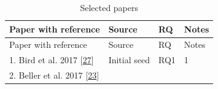 \documentclass[]{book}
\begin{document}
\begin{longtable}[]{@{}llll@{}}
\caption{\label{tab:build-analytics-selected-papers} Selected
papers}\tabularnewline
\toprule
\begin{minipage}[b]{0.48\columnwidth}\raggedright\strut
Paper with reference\strut
\end{minipage} & \begin{minipage}[b]{0.20\columnwidth}\raggedright\strut
Source\strut
\end{minipage} & \begin{minipage}[b]{0.14\columnwidth}\raggedright\strut
RQ\strut
\end{minipage} & \begin{minipage}[b]{0.06\columnwidth}\raggedright\strut
Notes\strut
\end{minipage}\tabularnewline
\midrule
\endfirsthead
\toprule
\begin{minipage}[b]{0.48\columnwidth}\raggedright\strut
Paper with reference\strut
\end{minipage} & \begin{minipage}[b]{0.20\columnwidth}\raggedright\strut
Source\strut
\end{minipage} & \begin{minipage}[b]{0.14\columnwidth}\raggedright\strut
RQ\strut
\end{minipage} & \begin{minipage}[b]{0.06\columnwidth}\raggedright\strut
Notes\strut
\end{minipage}\tabularnewline
\midrule
\endhead
\begin{minipage}[t]{0.48\columnwidth}\raggedright\strut
1. Bird et al. 2017
{[}\protect\hyperlink{ref-bird2017predicting}{27}{]}\strut
\end{minipage} & \begin{minipage}[t]{0.20\columnwidth}\raggedright\strut
Initial seed\strut
\end{minipage} & \begin{minipage}[t]{0.14\columnwidth}\raggedright\strut
RQ1\strut
\end{minipage} & \begin{minipage}[t]{0.06\columnwidth}\raggedright\strut
1\strut
\end{minipage}\tabularnewline
\begin{minipage}[t]{0.48\columnwidth}\raggedright\strut
2. Beller et al. 2017
{[}\protect\hyperlink{ref-beller2017oops}{23}{]}\strut
\end{minipage} & \begin{minipage}[t]{0.20\columnwidth}\raggedright\strut

\end{minipage}
\end{longtable}
\end{document}
